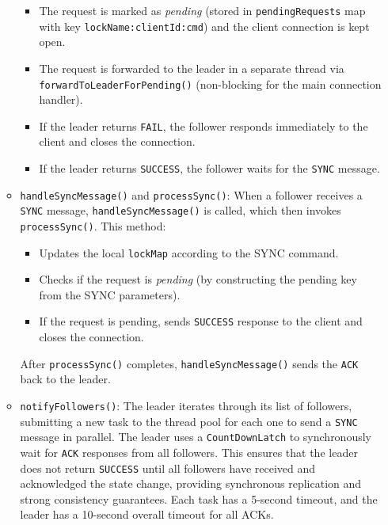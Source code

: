 \documentclass[a4paper,11pt]{article}
\begin{document}
\begin{itemize}
\begin{itemize}
                \begin{itemize}
                    \item The request is marked as \emph{pending} (stored in \texttt{pendingRequests} map with key \texttt{lockName:clientId:cmd}) and the client connection is kept open.
                    \item The request is forwarded to the leader in a separate thread via \texttt{forwardToLeaderForPending()} (non-blocking for the main connection handler).
                    \item If the leader returns \texttt{FAIL}, the follower responds immediately to the client and closes the connection.
                    \item If the leader returns \texttt{SUCCESS}, the follower waits for the \texttt{SYNC} message.
                \end{itemize}
            \item \texttt{handleSyncMessage()} and \texttt{processSync()}: When a follower receives a \texttt{SYNC} message, \texttt{handleSyncMessage()} is called, which then invokes \texttt{processSync()}. This method:
                \begin{itemize}
                    \item Updates the local \texttt{lockMap} according to the SYNC command.
                    \item Checks if the request is \emph{pending} (by constructing the pending key from the SYNC parameters).
                    \item If the request is pending, sends \texttt{SUCCESS} response to the client and closes the connection.
                \end{itemize}
                After \texttt{processSync()} completes, \texttt{handleSyncMessage()} sends the \texttt{ACK} back to the leader.
            \item \texttt{notifyFollowers()}: The leader iterates through its list of followers, submitting a new task to the thread pool for each one to send a \texttt{SYNC} message in parallel. The leader uses a \texttt{CountDownLatch} to synchronously wait for \texttt{ACK} responses from all followers. This ensures that the leader does not return \texttt{SUCCESS} until all followers have received and acknowledged the state change, providing synchronous replication and strong consistency guarantees. Each task has a 5-second timeout, and the leader has a 10-second overall timeout for all ACKs.
        \end{itemize}
\end{itemize}
\end{document}

